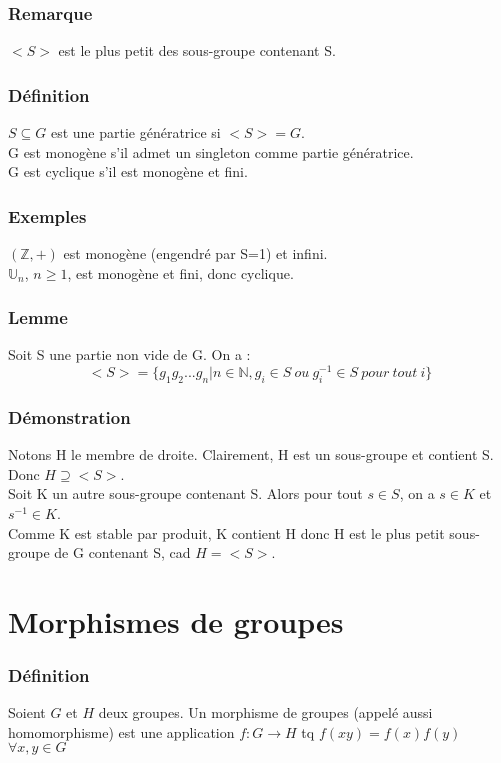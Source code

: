 \documentclass[a4paper, oneside]{report}
\newcommand{\N}{\mathbb{N}}
\newcommand{\Z}{\mathbb{Z}}
\newcommand{\U}{\mathbb{U}}
\begin{document}
\subsubsection{Remarque}
$<S>$ est le plus petit des sous-groupe contenant S.\\

\subsubsection{Définition}
$S\subseteq G$ est une partie génératrice si $<S>=G$.\\
G est monogène s'il admet un singleton comme partie génératrice.\\
G est cyclique s'il est monogène et fini.

\subsubsection{Exemples}
$(\Z,+)$ est monogène (engendré par S={1}) et infini.\\
$\U_n$, $n\geq 1$, est monogène et fini, donc cyclique.

\subsubsection{Lemme}
Soit S une partie non vide de G. On a :
$$<S> = \{g_1g_2...g_n | n\in \N, g_i\in S~ou~g_i^{-1}\in S~pour~tout~i  \}$$

\subsubsection{Démonstration}
Notons H le membre de droite. Clairement, H est un sous-groupe et contient S. Donc $H \supseteq <S>$.\\
Soit K un autre sous-groupe contenant S. Alors pour tout $s\in S$, on a $s\in K$ et $s^{-1}\in K$.\\
Comme K est stable par produit, K contient H donc H est le plus petit sous-groupe de G contenant S, cad $H=<S>$.


\section{Morphismes de groupes}

\subsubsection{Définition}
Soient $G$ et $H$ deux groupes. Un morphisme de groupes (appelé aussi homomorphisme) est une application $f:G\rightarrow H$ tq $f(xy)=f(x)f(y)$ $\forall x,y\in G$
\end{document}
